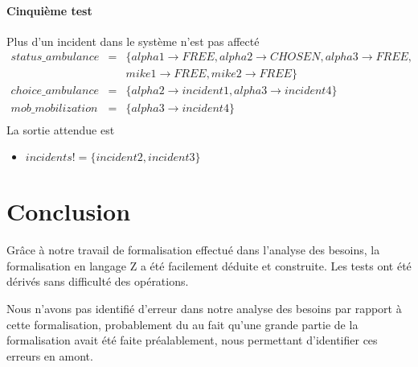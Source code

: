 \documentclass{report}
\begin{document}
\subsubsection{Cinquième test}
Plus d'un incident dans le système n'est pas affecté
\begin{eqnarray*}
status\_ambulance &=& \{alpha1 \rightarrow FREE, alpha2 \rightarrow CHOSEN, alpha3 \rightarrow FREE, \\ 
	&& mike1 \rightarrow FREE, mike2 \rightarrow FREE\} \\
choice\_ambulance &=& \{alpha2 \rightarrow incident1, alpha3 \rightarrow incident4\} \\
mob\_mobilization &=& \{alpha3 \rightarrow incident4\} \\
\end{eqnarray*}
La sortie attendue est 
\begin{itemize}
	\item $incidents! = \{incident2, incident3\}$
\end{itemize}

\chapter*{Conclusion}

Grâce à notre travail de formalisation effectué dans l'analyse des besoins, 
la formalisation en langage Z a été facilement déduite et construite. Les tests
ont été dérivés sans difficulté des opérations. 

Nous n'avons pas identifié d'erreur dans notre analyse des besoins par
rapport à cette formalisation, probablement du au fait qu'une grande partie
de la formalisation avait été faite préalablement, nous permettant d'identifier
ces erreurs en amont.
\end{document}
